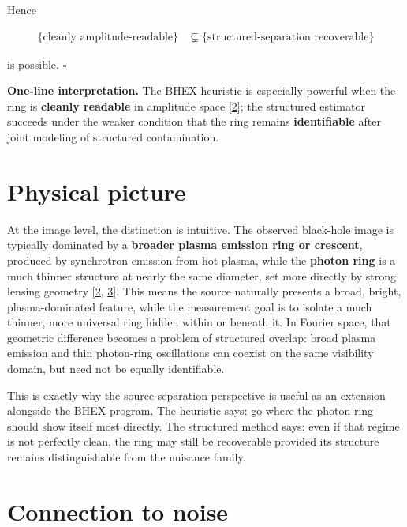 \documentclass[10pt,letterpaper,twocolumn]{article}
\begin{document}
Hence

\[
\begin{aligned}
\{\text{cleanly amplitude-readable}\}
&\subsetneq \{\text{structured-separation recoverable}\}
\end{aligned}
\]

is possible. \(\square\)

\par\smallskip\noindent{}\textbf{One-line interpretation.} The BHEX
heuristic is especially powerful when the ring is \textbf{cleanly
readable} in amplitude space [\hyperlink{ref-2}{2}]; the structured
estimator succeeds under the weaker condition that the ring remains
\textbf{identifiable} after joint modeling of structured contamination.

\hypertarget{physical-picture}{%
\section{Physical picture}\label{physical-picture}}

At the image level, the distinction is intuitive. The observed
black-hole image is typically dominated by a \textbf{broader plasma
emission ring or crescent}, produced by synchrotron emission from hot
plasma, while the \textbf{photon ring} is a much thinner structure at
nearly the same diameter, set more directly by strong lensing geometry
[\hyperlink{ref-2}{2}, \hyperlink{ref-3}{3}]. This means the source
naturally presents a broad, bright, plasma-dominated feature, while the
measurement goal is to isolate a much thinner, more universal ring
hidden within or beneath it. In Fourier space, that geometric difference
becomes a problem of structured overlap: broad plasma emission and thin
photon-ring oscillations can coexist on the same visibility domain, but
need not be equally identifiable.

This is exactly why the source-separation perspective is useful as an
extension alongside the BHEX program. The heuristic says: go where the
photon ring should show itself most directly. The structured method
says: even if that regime is not perfectly clean, the ring may still be
recoverable provided its structure remains distinguishable from the
nuisance family.

\hypertarget{connection-to-noise}{%
\section{Connection to noise}\label{connection-to-noise}}
\end{document}
